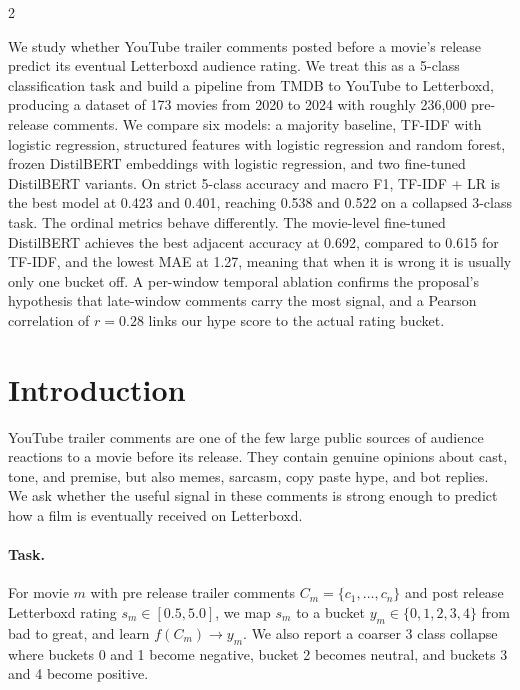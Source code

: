 \documentclass[10pt,letterpaper]{article}
\begin{document}
\begin{multicols}{2}

\par
\smallskip
\noindent We study whether YouTube trailer comments posted before a movie's release predict its eventual Letterboxd audience rating. We treat this as a 5-class classification task and build a pipeline from TMDB to YouTube to Letterboxd, producing a dataset of 173 movies from 2020 to 2024 with roughly 236{,}000 pre-release comments. We compare six models: a majority baseline, TF-IDF with logistic regression, structured features with logistic regression and random forest, frozen DistilBERT embeddings with logistic regression, and two fine-tuned DistilBERT variants. On strict 5-class accuracy and macro F1, TF-IDF + LR is the best model at 0.423 and 0.401, reaching 0.538 and 0.522 on a collapsed 3-class task. The ordinal metrics behave differently. The movie-level fine-tuned DistilBERT achieves the best adjacent accuracy at 0.692, compared to 0.615 for TF-IDF, and the lowest MAE at 1.27, meaning that when it is wrong it is usually only one bucket off. A per-window temporal ablation confirms the proposal's hypothesis that late-window comments carry the most signal, and a Pearson correlation of $r{=}0.28$ links our hype score to the actual rating bucket.

\vspace{-10pt}

\section{Introduction}
\noindent YouTube trailer comments are one of the few large public sources of audience reactions to a movie before its release. They contain genuine opinions about cast, tone, and premise, but also memes, sarcasm, copy paste hype, and bot replies. We ask whether the useful signal in these comments is strong enough to predict how a film is eventually received on Letterboxd.

\paragraph{Task.} For movie $m$ with pre release trailer comments $C_m = \{c_1,\dots,c_n\}$ and post release Letterboxd rating $s_m \in [0.5, 5.0]$, we map $s_m$ to a bucket $y_m \in \{0,1,2,3,4\}$ from bad to great, and learn $f(C_m) \to y_m$. We also report a coarser 3 class collapse where buckets 0 and 1 become negative, bucket 2 becomes neutral, and buckets 3 and 4 become positive.


\end{multicols}
\end{document}
